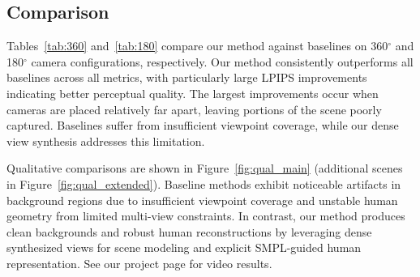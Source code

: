 \documentclass[acmtog]{acmart}
\newcommand{\degree}{$^\circ$}
\begin{document}
\begin{table}[t]
\centering
\caption{Quantitative comparison on 180{\degree} scenes. \colorbox{red!20}{red}: best, \colorbox{yellow!50}{yellow}: second best.}
%
\label{tab:180}
\end{table}

\subsection{Comparison}
Tables~\ref{tab:360} and~\ref{tab:180} compare our method against baselines on 360{\degree} and 180{\degree} camera configurations, respectively.
Our method consistently outperforms all baselines across all metrics, with particularly large LPIPS improvements indicating better perceptual quality.
The largest improvements occur when cameras are placed relatively far apart, leaving portions of the scene poorly captured.
Baselines suffer from insufficient viewpoint coverage, while our dense view synthesis addresses this limitation.

Qualitative comparisons are shown in Figure~\ref{fig:qual_main} (additional scenes in Figure~\ref{fig:qual_extended}).
Baseline methods exhibit noticeable artifacts in background regions due to insufficient viewpoint coverage and unstable human geometry from limited multi-view constraints.
In contrast, our method produces clean backgrounds and robust human reconstructions by leveraging dense synthesized views for scene modeling and explicit SMPL-guided human representation. See our project page for video results.
\end{document}

